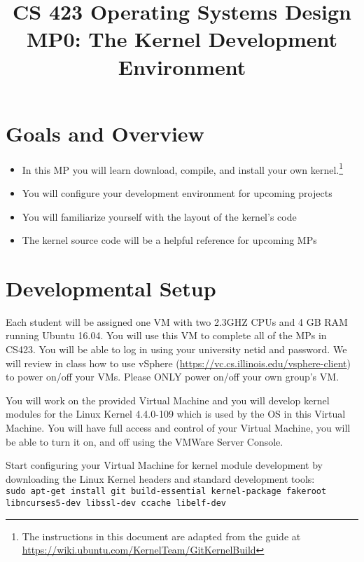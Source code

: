 \documentclass[10pt]{article}
\title{CS 423 Operating Systems Design\\
MP0: The Kernel Development Environment}
\author{}
\date{}
\begin{document}
\maketitle


\section{Goals and Overview}

\begin{itemize}[leftmargin=*]
\item In this MP you will learn download, compile, and install your own kernel.\footnote{The instructions in this document are adapted from the guide at \url{https://wiki.ubuntu.com/KernelTeam/GitKernelBuild}}
\item You will configure your development environment for upcoming projects
\item You will familiarize yourself with the layout of the kernel's code 
\item The kernel source code will be a helpful reference for upcoming MPs
\end{itemize}

\section{Developmental Setup}

Each student will be assigned one VM with two 2.3GHZ CPUs and 4 GB RAM running Ubuntu 16.04. You will use this VM to complete all of the MPs in CS423. You will be able to log in using your university netid and password. We will review in class how to use vSphere (\url{https://vc.cs.illinois.edu/vsphere-client}) to power on/off your VMs. Please ONLY power on/off your own group's VM.

You will work on the provided Virtual Machine  and you will develop kernel modules for the Linux Kernel 4.4.0-109 which is used by the OS in this Virtual Machine. You will have full access and control of your Virtual Machine, you will be able to turn it on, and off using the VMWare Server Console. 

Start configuring your Virtual Machine for kernel module development by downloading the Linux Kernel headers and standard development tools:\\

\noindent
{\footnotesize
{\tt sudo apt-get install git build-essential kernel-package fakeroot libncurses5-dev libssl-dev ccache libelf-dev}\\
}
\end{document}
